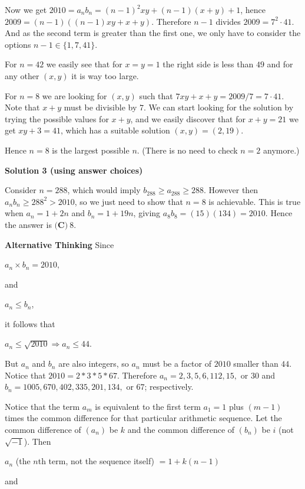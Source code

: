 \begin{enumerate}
 Now we get $2010 = a_n b_n = (n-1)^2xy + (n-1)(x+y) + 1$, hence $2009 = (n-1)( (n-1)xy + x + y )$. Therefore $n-1$ divides $2009 = 7^2 \cdot 41$. And as the second term is greater than the first one, we only have to consider the options $n-1\in\{1,7,41\}$.

 For $n=42$ we easily see that for $x=y=1$ the right side is less than $49$ and for any other $(x,y)$ it is way too large.

 For $n=8$ we are looking for $(x,y)$ such that $7xy + x + y = 2009/7 = 7\cdot 41$. Note that $x+y$ must be divisible by $7$. We can start looking for the solution by trying the possible values for $x+y$, and we easily discover that for $x+y=21$ we get $xy + 3 = 41$, which has a suitable solution $(x,y)=(2,19)$.

 Hence $n=8$ is the largest possible $n$. (There is no need to check $n=2$ anymore.)

 



\textbf{Solution 3 (using answer choices)}

Consider $n=288$, which would imply $b_{288}\ge a_{288}\ge 288$. However then $a_n b_n\ge 288^2>2010$, so we just need to show that $n=8$ is achievable. This is true when $a_n=1+2n$ and $b_n=1+19n$, giving $a_8 b_8=(15)(134)=2010$. Hence the answer is $\boxed{\textbf{(C)}\ 8}$.

 \textbf{Alternative Thinking} Since

 
$a_n\times b_n = 2010,$

 
and

 
$a_n \le b_n$,

 


 it follows that

 
$a_n \le \sqrt{2010} \Rightarrow a_n \le 44$.

 
But $a_n$ and $b_n$ are also integers, so $a_n$ must be a factor of $2010$ smaller than $44$. Notice that $2010 = 2*3*5*67$. Therefore $a_n = 2, 3, 5, 6, 112, 15,$ or $30$ and $b_n = 1005, 670, 402, 335, 201, 134,$ or $67$; respectively.

 
Notice that the term $a_m$ is equivalent to the first term $a_1 = 1$ plus $(m-1)$ times the common difference for that particular arithmetic sequence. Let the common difference of $(a_n)$ be $k$ and the common difference of $(b_n)$ be $i$ (not $\sqrt{-1}$). Then

 
$a_n$ (the $n$th term, not the sequence itself) $=1 + k(n-1)$

 
and


\end{enumerate}
